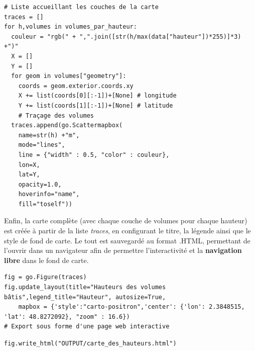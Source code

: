 \documentclass[
  11pt,
  french,
]{article}
\begin{document}
\begin{tcolorbox}[title= Génération des couches de la carte ,colback=boitecode]
\begin{lstlisting}[style=code]
# Liste accueillant les couches de la carte
traces = []
for h,volumes in volumes_par_hauteur:
  couleur = "rgb(" + ",".join([str(h/max(data["hauteur"])*255)]*3) +")"
  X = []
  Y = []
  for geom in volumes["geometry"]:
    coords = geom.exterior.coords.xy
    X += list(coords[0][:-1])+[None] # longitude
    Y += list(coords[1][:-1])+[None] # latitude
    # Traçage des volumes
  traces.append(go.Scattermapbox(
    name=str(h) +"m",
    mode="lines",
    line = {"width" : 0.5, "color" : couleur},
    lon=X,
    lat=Y,
    opacity=1.0,
    hoverinfo="name",
    fill="toself"))\end{lstlisting}
\end{tcolorbox}

Enfin, la carte complète (avec chaque couche de volumes pour chaque
hauteur) est créée à partir de la liste \emph{traces}, en configurant le
titre, la légende ainsi que le style de fond de carte. Le tout est
sauvegardé au format .HTML, permettant de l'ouvrir dans un navigateur
afin de permettre l'interactivité et la \textbf{navigation libre} dans
le fond de carte.

\begin{tcolorbox}[title= Export de la carte ,colback=boitecode]
\begin{lstlisting}[style=code]
fig = go.Figure(traces)
fig.update_layout(title="Hauteurs des volumes bâtis",legend_title="Hauteur", autosize=True,
    mapbox = {'style':"carto-positron",'center': {'lon': 2.3848515, 'lat': 48.8272092}, "zoom" : 16.6})
# Export sous forme d'une page web interactive\end{lstlisting}
\begin{lstlisting}[style=code]
fig.write_html("OUTPUT/carte_des_hauteurs.html")\end{lstlisting}
\end{tcolorbox}
\end{document}

